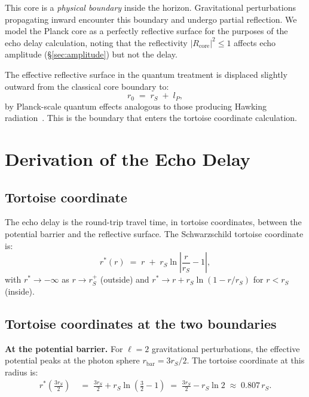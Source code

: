\documentclass[12pt]{article}
\newcommand{\lP}{l_P}
\newcommand{\rS}{r_S}
\newcommand{\rstar}{r^*}
\begin{document}
This core is a \emph{physical boundary} inside the horizon.  Gravitational
perturbations propagating inward encounter this boundary and undergo partial
reflection.  We model the Planck core as a perfectly reflective surface
for the purposes of the echo delay calculation, noting that the reflectivity
$|R_{\mathrm{core}}|^2 \leq 1$ affects echo amplitude (§\ref{sec:amplitude})
but not the delay.

The effective reflective surface in the quantum treatment is displaced
slightly outward from the classical core boundary to:
\begin{equation}
  r_0 \;=\; \rS \;+\; \lP,
  \label{eq:r0}
\end{equation}
by Planck-scale quantum effects analogous to those producing Hawking
radiation~\cite{hawking1975}.  This is the boundary that enters the tortoise
coordinate calculation.

\section{Derivation of the Echo Delay}
\label{sec:tortoise}

\subsection{Tortoise coordinate}

The echo delay is the round-trip travel time, in tortoise coordinates,
between the potential barrier and the reflective surface.  The Schwarzschild
tortoise coordinate is:
\begin{equation}
  \rstar(r) \;=\; r \;+\; \rS\ln\!\left|\frac{r}{\rS} - 1\right|,
  \label{eq:tortoise}
\end{equation}
with $\rstar \to -\infty$ as $r \to \rS^+$ (outside) and
$\rstar \to r + \rS\ln(1 - r/\rS)$ for $r < \rS$ (inside).

\subsection{Tortoise coordinates at the two boundaries}

\textbf{At the potential barrier.}
For $\ell = 2$ gravitational perturbations, the effective potential peaks
at the photon sphere $r_{\mathrm{bar}} = 3\rS/2$.  The tortoise coordinate
at this radius is:
\begin{align}
  \rstar({\textstyle\frac{3\rS}{2}})
  &\;=\; \frac{3\rS}{2} + \rS\ln\!\left(\frac{3}{2}-1\right)
  \;=\; \frac{3\rS}{2} - \rS\ln 2
  \;\approx\; 0.807\,\rS.
  \label{eq:rstar_bar}
\end{align}
\end{document}
